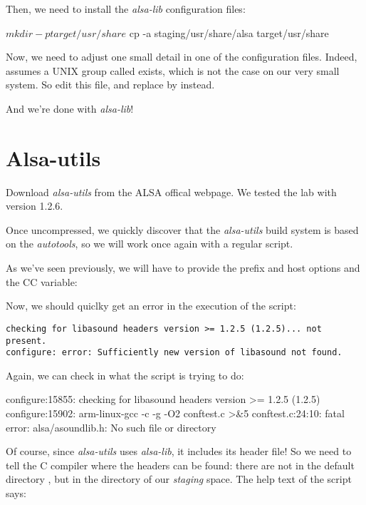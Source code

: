 Then, we need to install the {\em alsa-lib} configuration files:

\begin{bashinput}
$ mkdir -p target/usr/share
$ cp -a staging/usr/share/alsa target/usr/share
\end{bashinput}

Now, we need to adjust one small detail in one of the configuration
files. Indeed,  assumes a UNIX group
called  exists, which is not the case on our very small
system. So edit this file, and replace  by  instead.

And we're done with {\em alsa-lib}!

\section{Alsa-utils}

Download {\em alsa-utils} from the ALSA offical webpage. We tested the lab
with version 1.2.6.

Once uncompressed, we quickly discover that the {\em alsa-utils} build
system is based on the {\em autotools}, so we will work once again
with a regular  script.

As we've seen previously, we will have to provide the prefix and host
options and the CC variable:


Now, we should quiclky get an error in the execution of the
 script:

\begin{verbatim}
checking for libasound headers version >= 1.2.5 (1.2.5)... not present.
configure: error: Sufficiently new version of libasound not found.
\end{verbatim}

Again, we can check in  what the 
script is trying to do:

\begin{terminaloutput}
configure:15855: checking for libasound headers version >= 1.2.5 (1.2.5)
configure:15902: arm-linux-gcc -c -g -O2  conftest.c >&5
conftest.c:24:10: fatal error: alsa/asoundlib.h: No such file or directory
\end{terminaloutput}
\normalsize

Of course, since {\em alsa-utils} uses {\em alsa-lib}, it includes
its header file! So we need to tell the C compiler where the headers
can be found: there are not in the default directory
, but in the  directory of our
{\em staging} space. The help text of the  script says:

